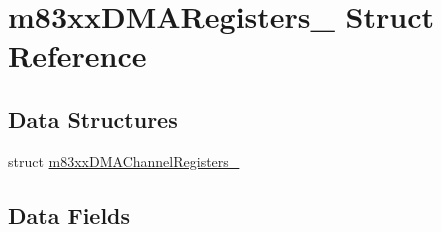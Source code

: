 \hypertarget{structm83xxDMARegisters__}{}\section{m83xx\+D\+M\+A\+Registers\+\_\+ Struct Reference}
\label{structm83xxDMARegisters__}
\subsection*{Data Structures}
\begin{DoxyCompactItemize}
\item 
struct \mbox{\hyperlink{structm83xxDMARegisters___1_1m83xxDMAChannelRegisters__}{m83xx\+D\+M\+A\+Channel\+Registers\+\_\+}}
\end{DoxyCompactItemize}
\subsection*{Data Fields}
